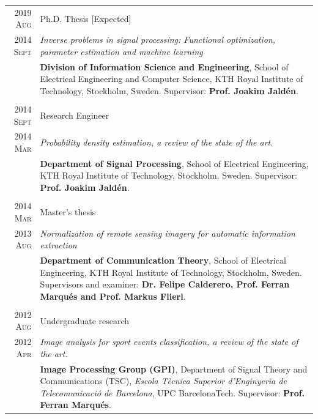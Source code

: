 \documentclass[a4paper,10pt]{article}
\begin{document}
    \begin{tabular}{r|p{13cm}}
    
      \textsc{2019 Aug} 	& Ph.D. Thesis [Expected] \\
      \textsc{2014 Sept} 	& \emph{Inverse problems in signal processing: Functional optimization, parameter estimation and machine learning} \\
				& \footnotesize{ \textbf{Division of Information Science and Engineering}, School of Electrical Engineering and Computer Science,
				  KTH Royal Institute of Technology, Stockholm, Sweden. Supervisor: \textbf{Prof. Joakim Jald\'{e}n}.} \\
      \multicolumn{2}{c}{} \\

      \textsc{2014 Sept} 	& Research Engineer \\
      \textsc{2014 Mar} 	& \emph{Probability density estimation, a review of the state of the art.} \\ 
				& \footnotesize{ \textbf{Department of Signal Processing}, School of Electrical Engineering,
				  KTH Royal Institute of Technology, Stockholm, Sweden. Supervisor: \textbf{Prof. Joakim Jald\'{e}n}.} \\
      \multicolumn{2}{c}{} \\

      \textsc{2014 Mar} 	& Master's thesis \\
      \textsc{2013 Aug} 	& \emph{ Normalization of remote sensing imagery for automatic information extraction } \\ 
				& \footnotesize{ \textbf{Department of Communication Theory}, School of Electrical Engineering,
				  KTH Royal Institute of Technology, Stockholm, Sweden. Supervisors and examiner: \textbf{Dr. Felipe Calderero, Prof. Ferran Marqu\'{e}s and Prof. Markus Flierl}.} \\
      \multicolumn{2}{c}{} \\


      \textsc{2012 Aug} 	& Undergraduate research \\
      \textsc{2012 Apr} 	& \emph{Image analysis for sport events classification, a review of the state of the art.} \\ 
				& \footnotesize{ \textbf{Image Processing Group (GPI)}, Department of Signal Theory and 
				  Communications (TSC), \emph{Escola T\`{e}cnica Superior d'Enginyeria de Telecomunicaci\'{o} 
				  de Barcelona}, UPC BarcelonaTech. Supervisor: \textbf{Prof. Ferran Marqu\'{e}s}.} \\

    \end{tabular}
\end{document}
